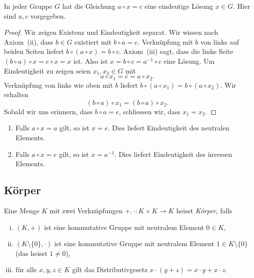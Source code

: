 \documentclass[../main.tex]{subfiles}
\begin{document}
\begin{proposition}
  In jeder Gruppe $G$
  hat die Gleichung $a \circ x = c$
  eine eindeutige Lösung $x \in G$. Hier sind $a,c$ vorgegeben.
\end{proposition}

\begin{proof}
  Wir zeigen Existenz und Eindeutigkeit separat. Wir wissen nach
  Axiom~(ii), dass $b \in G$ existiert mit $b \circ a = e$.
  Verknüpfung mit $b$ von links auf beiden Seiten liefert
  $b \circ (a \circ x) = b \circ c$. Axiom~(iii) sagt, dass
  die linke Seite
  \(
    (b \circ a) \circ x = e \circ x = x
  \)
  ist. Also ist $x = b \circ c = a^{-1} \circ c$ eine Lösung.
  Um Eindeutigkeit zu zeigen seien $x_{1}, x_{2} \in G$ mit
  \[
    a \circ x_{1} = c = a \circ x_{2}.
  \]
  Verknüpfung von links wie oben mit $b$ liefert
  \(b \circ (a \circ x_{1}) = b \circ (a \circ x_{2})\).
  Wir erhalten
  \[
    (b \circ a) \circ x_{1} = (b \circ a) \circ x_{2}.
  \]
  Sobald wir uns erinnern, dass $b \circ a = e$, schliessen wir,
  dass $x_{1} = x_{2}$.
\end{proof}

\begin{specialcases}
  \leavevmode
  \begin{enumerate}[(1)]
    \item Falls $a \circ x = a$ gilt, so ist $x = e$. Dies liefert Eindeutigkeit
      des neutralen Elements.
    \item Falls $a \circ x = e$ gilt, so ist $x = a^{-1}$. Dies liefert
      Eindeutigkeit des inversen Elements.
  \end{enumerate}
\end{specialcases}

\subsection*{Körper}
\begin{definition}
  Eine Menge $K$ mit zwei Verknüpfungen $+, \cdot \colon K \times K \to K$ heisst
  \emph{Körper}, falls
  \begin{enumerate}[(i)]
    \item $(K, +)$ ist eine kommutative Gruppe mit neutralem
      Element $0 \in K$,
    \item $(K \setminus \{0\}, \cdot)$ ist eine kommutative Gruppe
      mit neutralem Element $1 \in K \setminus \{0\}$ (das heisst $1 \neq 0$),
    \item für alle $x,y,z \in K$ gilt das
      Distributivgesetz $x \cdot (y + z) = x \cdot y + x \cdot z$.
  \end{enumerate}
\end{definition}
\end{document}
